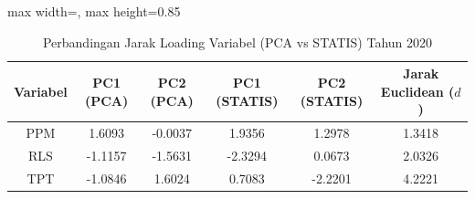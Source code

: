 \begin{table}[H]
\centering
\caption{Perbandingan Jarak Loading Variabel (PCA vs STATIS) Tahun 2020} \makeatletter{}\makeatother
\begin{adjustbox}{max width=\textwidth, max height=0.85\textheight}
\begin{tabular}{|c|c|c|c|c|c|}
\hline
\textbf{Variabel} & \textbf{PC1 (PCA)} & \textbf{PC2 (PCA)} & \textbf{PC1 (STATIS)} & \textbf{PC2 (STATIS)} & \textbf{Jarak Euclidean ($d$)} \\
\hline
PPM & 1.6093 & -0.0037 & 1.9356 & 1.2978 & 1.3418 \\
RLS & -1.1157 & -1.5631 & -2.3294 & 0.0673 & 2.0326 \\
TPT & -1.0846 & 1.6024 & 0.7083 & -2.2201 & 4.2221 \\
\hline
\end{tabular}
\end{adjustbox}
\end{table}